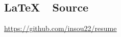 \documentclass[a4paper]{deedy-resume}
\begin{document}
\begin{minipage}[t]{0.35\textwidth}

\vspace{0.8cm}
\subsection{\LaTeX \ \ Source}

\href{https://github.com/insou22/resume}
	{\underline{https://github.com/insou22/resume}}


\end{minipage}
\hfill
%
%
\end{document}
